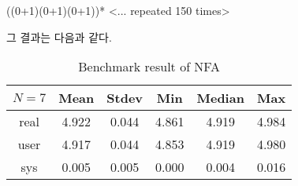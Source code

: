 \documentclass[a4paper,10pt]{scrartcl}
\numberwithin{figure}{section}
\numberwithin{table}{section}
\begin{document}
\begin{codebox}
((0+1)(0+1)(0+1))* <... repeated 150 times>
\end{codebox}

\noindent 그 결과는 다음과 같다.

\begin{table}[H]
  \centering
  \caption{Benchmark result of NFA}\label{tab:benchmark}
  \vspace*{-10pt}
  \begin{tabular}[t]{ c c c c c c }
    \toprule
    $N=7$ & Mean  & Stdev & Min   & Median & Max   \\
    \midrule
    real  & 4.922 & 0.044 & 4.861 & 4.919  & 4.984 \\
    user  & 4.917 & 0.044 & 4.853 & 4.919  & 4.980 \\
    sys   & 0.005 & 0.005 & 0.000 & 0.004  & 0.016 \\
    \bottomrule
  \end{tabular}
\end{table}
\end{document}
